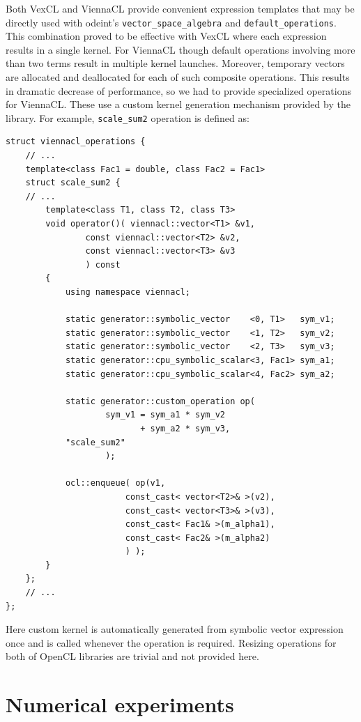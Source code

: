 \documentclass[final]{siamltex}
\newcommand{\code}[1]{\lstinline|#1|}
\begin{document}
Both VexCL and ViennaCL provide convenient expression templates that
may be directly used with odeint's \code{vector_space_algebra} and
\code{default_operations}. This combination proved to be 
effective with VexCL where each expression results in a single
kernel. For ViennaCL though default operations involving more than two
terms result in multiple kernel launches.  Moreover, temporary vectors
are allocated and deallocated for each of such composite operations.
This results in dramatic decrease of performance, so we had to provide
specialized operations for ViennaCL. These use a custom kernel
generation mechanism provided by the library.  For example,
\code{scale_sum2} operation is defined as:
\begin{lstlisting}
struct viennacl_operations {
    // ...
    template<class Fac1 = double, class Fac2 = Fac1>
    struct scale_sum2 {
	// ...
        template<class T1, class T2, class T3>
        void operator()( viennacl::vector<T1> &v1,
                const viennacl::vector<T2> &v2,
                const viennacl::vector<T3> &v3
                ) const
        {
            using namespace viennacl;

            static generator::symbolic_vector    <0, T1>   sym_v1;
            static generator::symbolic_vector    <1, T2>   sym_v2;
            static generator::symbolic_vector    <2, T3>   sym_v3;
            static generator::cpu_symbolic_scalar<3, Fac1> sym_a1;
            static generator::cpu_symbolic_scalar<4, Fac2> sym_a2;

            static generator::custom_operation op(
                    sym_v1 = sym_a1 * sym_v2
                           + sym_a2 * sym_v3,
		    "scale_sum2"
                    );

            ocl::enqueue( op(v1,
                        const_cast< vector<T2>& >(v2),
                        const_cast< vector<T3>& >(v3),
                        const_cast< Fac1& >(m_alpha1),
                        const_cast< Fac2& >(m_alpha2)
                        ) );
        }
    };
    // ...
};
\end{lstlisting}
Here custom kernel is automatically generated from symbolic vector expression
once and is called whenever the operation is required.  Resizing operations for
both of OpenCL libraries are trivial and not provided here.




\section{Numerical experiments}
\end{document}
